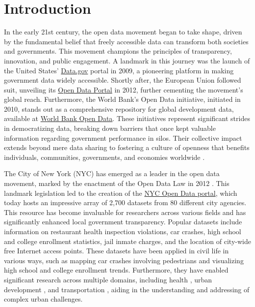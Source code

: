 \documentclass[linenumber]{jdsart}
\begin{document}
\section{Introduction} 
\label{sec:intro}

In the early 21st century, the open data movement began 
to take shape, driven by the fundamental belief that 
freely accessible data can transform both societies and 
governments. This movement champions the principles
of transparency, innovation, and public engagement. 
A landmark in this journey was the launch of the United States'
\href{https://www.data.gov}{Data.gov} portal in 2009, a pioneering
platform in making government data widely accessible. Shortly after,
the European Union followed suit, unveiling its
\href{https://data.europa.eu/euodp}{Open Data Portal} in 2012, further
cementing the movement's global reach. Furthermore, the World Bank's Open
Data initiative, initiated in 2010, stands out as a comprehensive
repository for global development data, available at
\href{https://data.worldbank.org}{World Bank Open Data}. 
These initiatives represent significant strides in democratizing data, 
breaking down barriers that once kept valuable information 
regarding government performance in silos. Their collective impact 
extends beyond mere data sharing to fostering a culture of openness 
that benefits individuals, communities, governments, and economies worldwide 
\citep{barns2016mine, wang2016adoption}.


The City of New York (NYC) has emerged as a leader in the open data movement,
marked by the enactment of the Open Data Law in 2012
\citep{zuiderwijk2014open}. This landmark legislation led to the
creation of the \href{https://opendata.cityofnewyork.us}{NYC Open Data
  portal}, which today hosts an impressive array of 2,700 datasets
from 80 different city agencies. This resource has become invaluable
for researchers across various fields and has significantly enhanced
local government transparency. Popular datasets include information on
restaurant health inspection violations, car crashes, high school and
college enrollment statistics, jail inmate charges, and the location
of city\mbox{-}wide free Internet access points. These datasets have been
applied in civil life in various ways, such as mapping car crashes
involving pedestrians and visualizing high school and college
enrollment trends. Furthermore, they have enabled significant research
across multiple domains, including health \citep{cantor2018facets,
  shankar2021data}, urban development \citep{neves2020impacts}, and
transportation \citep{gerte2019understanding}, aiding in the
understanding and addressing of complex urban challenges.
\end{document}
